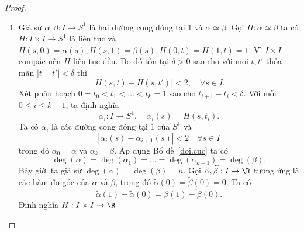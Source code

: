 \begin{proof}
\begin{enumerate}
			\item Giả sử $\alpha,\beta:I\to S^1$ là hai đường cong đóng tại 1 và $\alpha\simeq \beta$. 
			Gọi $H: \alpha\simeq \beta$ ta có $H: I \times I \to S^1$ là liên tục và $H(s,0)=\alpha(s), H(s,1)=\beta(s), H(0,t)=H(1,t)=1$.  Vì $I\times I$ compắc nên $H$ liên tục đều. Do đó tồn tại $\delta > 0$ sao cho với mọi $t,t'$ thỏa mãn $|t - t'| < \delta$ thì
			\[
			|H(s,t) - H(s,t')| < 2, \quad \forall s \in I.
			\]
			Xét phân hoạch %
			$0 = t_0 < t_1 < \dots < t_k = 1$ sao cho $t_{i+1} - t_i < \delta$. %
			Với mỗi $0\leq i\leq k-1$, ta định nghĩa
			\[
			\alpha_i: I\to S^1, \quad \alpha_i(s)= H(s,t_i).
			\]
			Ta có $\alpha_i$ là các đường cong đóng tại $1$ của $S^1$ và 
			\[
			|\alpha_i(s) - \alpha_{i+1}(s)| < 2 \quad \forall s \in I
			\]
			trong đó $\alpha_0=\alpha$ và $\alpha_k=\beta$.
			Áp dụng Bổ đề~\ref{doi.cuc} ta có 			
			\[
			\deg(\alpha) = \deg(\alpha_1) = \dots = \deg(\alpha_{k-1}) = \deg(\beta).
			\]
			Bây giờ, 
		ta giả sử $\deg(\alpha) = \deg(\beta)=n$. 
		Gọi $\widetilde{\alpha}, \widetilde{\beta}: I \to \R$ tương ứng là các hàm đo góc của $\alpha$ và $\beta$, trong đó $\widetilde{\alpha}(0)=\widetilde{\beta}(0)=0$. Ta có
			\[
			\widetilde{\alpha}(1) - \widetilde{\alpha}(0) = \widetilde{\beta}(1) - \widetilde{\beta}(0).
			\]
		Đinh nghĩa $H: I \times I \to \R$ %

\end{enumerate}
\end{proof}
